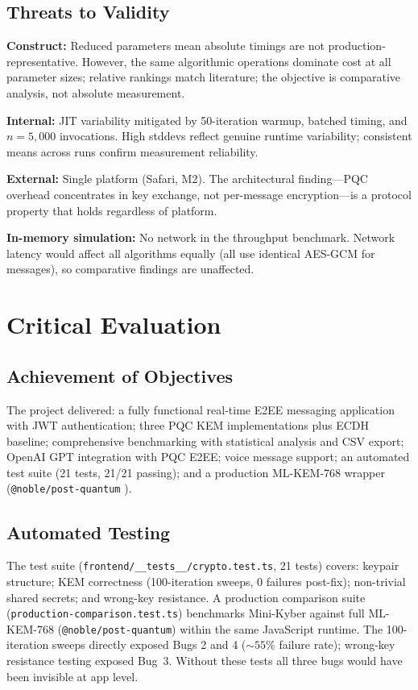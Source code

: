 \documentclass[11pt,a4paper]{article}
\begin{document}
\subsection{Threats to Validity}

\textbf{Construct:} Reduced parameters mean absolute timings are not production-representative. However, the same algorithmic operations dominate cost at all parameter sizes; relative rankings match literature; the objective is comparative analysis, not absolute measurement.

\textbf{Internal:} JIT variability mitigated by 50-iteration warmup, batched timing, and $n=5{,}000$ invocations. High stddevs reflect genuine runtime variability; consistent means across runs confirm measurement reliability.

\textbf{External:} Single platform (Safari, M2). The architectural finding---PQC overhead concentrates in key exchange, not per-message encryption---is a protocol property that holds regardless of platform.

\textbf{In-memory simulation:} No network in the throughput benchmark. Network latency would affect all algorithms equally (all use identical AES-GCM for messages), so comparative findings are unaffected.

\section{Critical Evaluation}

\subsection{Achievement of Objectives}

The project delivered: a fully functional real-time E2EE messaging application with JWT authentication; three PQC KEM implementations plus ECDH baseline; comprehensive benchmarking with statistical analysis and CSV export; OpenAI GPT integration with PQC E2EE; voice message support; an automated test suite (21 tests, 21/21 passing); and a production ML-KEM-768 wrapper (\texttt{@noble/post-quantum} \cite{noble_pq}).

\subsection{Automated Testing}

The test suite (\texttt{frontend/\_\_tests\_\_/crypto.test.ts}, 21 tests) covers: keypair structure; KEM correctness (100-iteration sweeps, 0 failures post-fix); non-trivial shared secrets; and wrong-key resistance. A production comparison suite (\texttt{production-comparison.test.ts}) benchmarks Mini-Kyber against full ML-KEM-768 (\texttt{@noble/post-quantum}) within the same JavaScript runtime. The 100-iteration sweeps directly exposed Bugs 2 and 4 (${\sim}55\%$ failure rate); wrong-key resistance testing exposed Bug~3. Without these tests all three bugs would have been invisible at app level.
\end{document}
